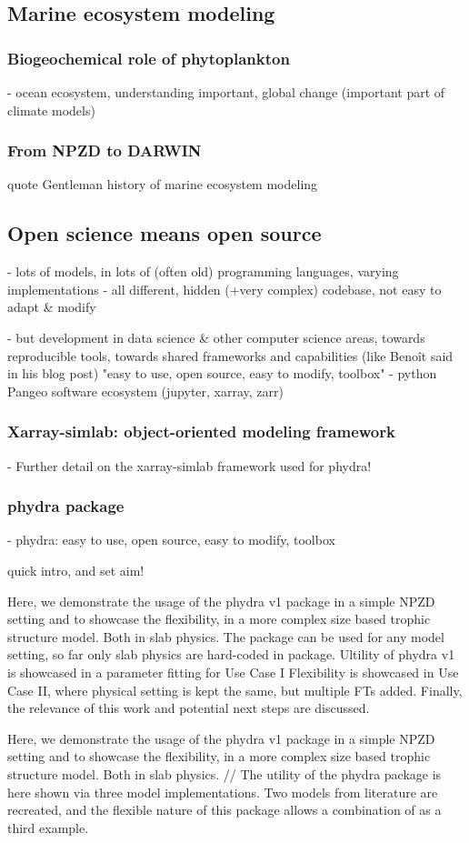 \documentclass[journal abbreviation, manuscript]{copernicus}
\begin{document}
\introduction  %

\subsection{Marine ecosystem modeling}

\subsubsection{Biogeochemical role of phytoplankton}
- ocean ecosystem, understanding important, global change (important part of climate models)

\subsubsection{From NPZD to DARWIN}
quote Gentleman history of marine ecosystem modeling


\subsection{Open science means open source}
- lots of models, in lots of (often old) programming languages, varying implementations
- all different, hidden (+very complex) codebase, not easy to adapt \& modify

- but development in data science & other computer science areas, towards reproducible tools, towards shared frameworks and capabilities (like Benoît said in his blog post)
"easy to use, open source, easy to modify, toolbox"
- python Pangeo software ecosystem (jupyter, xarray, zarr)

\subsubsection{Xarray-simlab: object-oriented modeling framework}
- Further detail on the xarray-simlab framework used for phydra!

\subsubsection{phydra package}
- phydra: easy to use, open source, easy to modify, toolbox

quick intro, and set aim!

Here, we demonstrate the usage of the phydra v1 package in a simple NPZD setting and to showcase the flexibility, in a more complex size based trophic structure model. Both in slab physics.
The package can be used for any model setting, so far only slab physics are hard-coded in package.
Ultility of phydra v1 is showcased in a parameter fitting for Use Case I
Flexibility is showcased in Use Case II, where physical setting is kept the same, but multiple FTs added.
Finally, the relevance of this work and potential next steps are discussed.

Here, we demonstrate the usage of the phydra v1 package in a simple NPZD setting and to showcase the flexibility, in a more complex size based trophic structure model. Both in slab physics.
//
The utility of the phydra package is here shown via three model implementations. Two models from literature are recreated, and the flexible nature of this package allows a combination of as a third example. 
\end{document}
